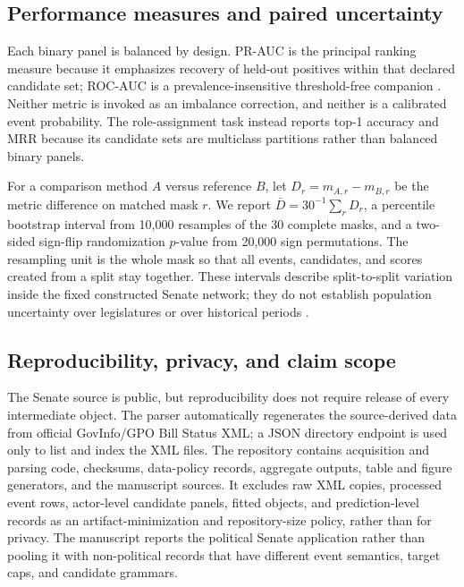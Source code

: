 \documentclass{nws}
\begin{document}
\subsection{Performance measures and paired uncertainty}\label{sec:evaluation}

Each binary panel is balanced by design. PR-AUC is the principal ranking measure because it emphasizes recovery of held-out positives within that declared candidate set; ROC-AUC is a prevalence-insensitive threshold-free companion \citep{saitoRehmsmeier2015}. Neither metric is invoked as an imbalance correction, and neither is a calibrated event probability. The role-assignment task instead reports top-1 accuracy and MRR because its candidate sets are multiclass partitions rather than balanced binary panels.

For a comparison method $A$ versus reference $B$, let $D_r=m_{A,r}-m_{B,r}$ be the metric difference on matched mask $r$. We report $\bar D=30^{-1}\sum_rD_r$, a percentile bootstrap interval from 10,000 resamples of the 30 complete masks, and a two-sided sign-flip randomization $p$-value from 20,000 sign permutations. The resampling unit is the whole mask so that all events, candidates, and scores created from a split stay together. These intervals describe split-to-split variation inside the fixed constructed Senate network; they do not establish population uncertainty over legislatures or over historical periods \citep{efronTibshirani1994}.

\subsection{Reproducibility, privacy, and claim scope}\label{sec:scope}

The Senate source is public, but reproducibility does not require release of every intermediate object. The parser automatically regenerates the source-derived data from official GovInfo/GPO Bill Status XML; a JSON directory endpoint is used only to list and index the XML files. The repository contains acquisition and parsing code, checksums, data-policy records, aggregate outputs, table and figure generators, and the manuscript sources. It excludes raw XML copies, processed event rows, actor-level candidate panels, fitted objects, and prediction-level records as an artifact-minimization and repository-size policy, rather than for privacy. The manuscript reports the political Senate application rather than pooling it with non-political records that have different event semantics, target caps, and candidate grammars.
\end{document}
